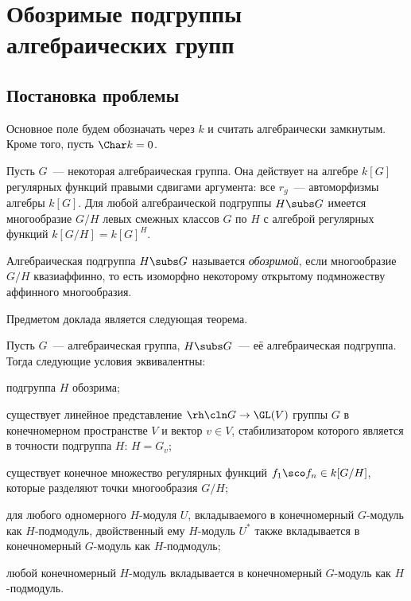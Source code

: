\documentclass{article}
\begin{document}
\title{}
\author{}
\date{\today}
\maketitle
\section{Обозримые подгруппы алгебраических групп}

\subsection{Постановка проблемы}

Основное поле будем обозначать через $k$ и считать алгебраически
замкнутым. Кроме того, пусть $\Char k=0$.

Пусть $G$~--- некоторая алгебраическая группа. Она действует на алгебре $k[G]$ регулярных функций правыми сдвигами
аргумента:  все $r_g$~--- автоморфизмы алгебры $k[G]$. Для любой
алгебраической подгруппы $H\subs G$ имеется многообразие $G/H$ левых смежных классов $G$ по $H$ с алгеброй
регулярных функций $k[G/H]=k[G]^H$.

\begin{df} Алгебраическая подгруппа $H\subs G$ называется \textit{обозримой}, если многообразие $G/H$ квазиаффинно, то
есть изоморфно некоторому открытому подмножеству аффинного многообразия.
\end{df}
Предметом доклада является следующая теорема.
\begin{theorem}\label{main} Пусть $G$~--- алгебраическая группа, $H\subs G$~--- её алгебраическая подгруппа. Тогда
следующие условия эквивалентны:
\begin{nums}{-1}
\item подгруппа $H$ обозрима;
\item существует линейное представление $\rh\cln G\to\GL(V)$ группы $G$ в конечномерном пространстве $V$ и вектор $v\in
V$, стабилизатором которого является в точности подгруппа $H$: $H=G_v$;
\item существует конечное множество регулярных функций $f_1\sco f_n\in k[G/H]$, которые разделяют точки многообразия
$G/H$;
\item для любого одномерного $H$-модуля $U$, вкладываемого в конечномерный $G$-модуль как $H$-подмодуль,
двойственный ему $H$-модуль $U^*$ также вкладывается в конечномерный $G$-модуль как $H$-подмодуль;
\item любой конечномерный $H$-модуль вкладывается в конечномерный $G$-модуль как $H$-подмодуль.
\end{nums}
\end{theorem}
\end{document}
